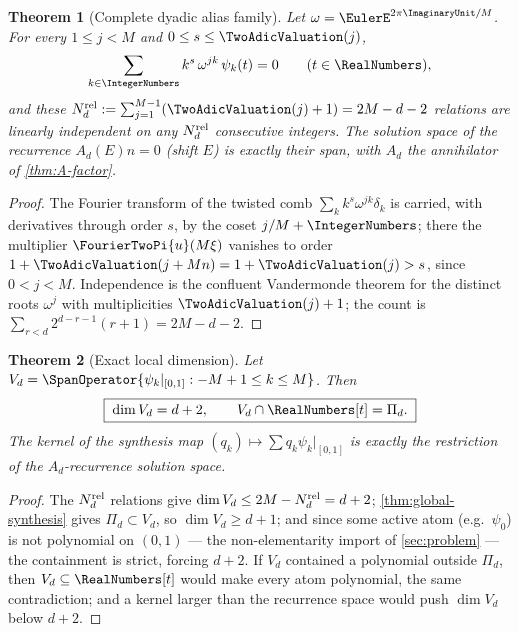 \documentclass[11pt,oneside]{article}
\numberwithin{equation}{section}
\newtheorem{theorem}{Theorem}[section]
\theoremstyle{definition}
\theoremstyle{remark}
\newcommand{\PiD}{\Pi_d}
\begin{document}
\begin{theorem}[Complete dyadic alias family]
\label{thm:alias-family}
Let $\omega=\EulerE^{2\pi\ImaginaryUnit/M}$.  For every $1\le j<M$ and
$0\le s\le\TwoAdicValuation(j)$,
\begin{equation}
 \sum_{k\in\IntegerNumbers}k^{s}\,\omega^{jk}\,\psi_k(t)=0
 \qquad(t\in\RealNumbers),
 \label{eq:alias-zero}
\end{equation}
and these
$N_d^{\rm rel}:=\sum_{j=1}^{M-1}(\TwoAdicValuation(j)+1)=2M-d-2$ relations are
linearly independent on any $N_d^{\rm rel}$ consecutive integers.  The solution
space of the recurrence $A_d(E)n=0$ (shift $E$) is exactly their
span, with $A_d$ the annihilator of
\cref{thm:A-factor}.
\end{theorem}

\begin{proof}
The Fourier transform of the twisted comb
$\sum_kk^{s}\omega^{jk}\delta_k$ is carried, with derivatives through
order $s$, by the coset $j/M+\IntegerNumbers$; there the multiplier
$\FourierTwoPi{u}(M\xi)$ vanishes to order
$1+\TwoAdicValuation(j+Mn)=1+\TwoAdicValuation(j)>s$, since $0<j<M$.  Independence is the
confluent Vandermonde theorem for the distinct roots
$\omega^{j}$ with multiplicities $\TwoAdicValuation(j)+1$; the count is
$\sum_{r<d}2^{d-r-1}(r+1)=2M-d-2$.
\end{proof}

\begin{theorem}[Exact local dimension]
\label{thm:local-dim}
Let $V_d=\SpanOperator\{\psi_k|_{[0,1]}:-M+1\le k\le M\}$.  Then
\begin{equation}
 \boxed{\;\dim V_d=d+2,
 \qquad
 V_d\cap\RealNumbers[t]=\PiD.\;}
 \label{eq:local-dim}
\end{equation}
The kernel of the synthesis map
$(q_k)\mapsto\sum q_k\psi_k|_{[0,1]}$ is exactly the restriction of
the $A_d$-recurrence solution space.
\end{theorem}

\begin{proof}
The $N_d^{\rm rel}$ relations give
$\dim V_d\le2M-N_d^{\rm rel}=d+2$;
\cref{thm:global-synthesis} gives $\PiD\subset V_d$, so
$\dim V_d\ge d+1$; and since some active atom (e.g.\ $\psi_0$) is not
polynomial on $(0,1)$ --- the non-elementarity import of
\cref{sec:problem} --- the containment is strict, forcing $d+2$.  If
$V_d$ contained a polynomial outside $\PiD$, then
$V_d\subseteq\RealNumbers[t]$ would make every atom polynomial, the same
contradiction; and a kernel larger than the recurrence space would
push $\dim V_d$ below $d+2$.
\end{proof}
\end{document}
